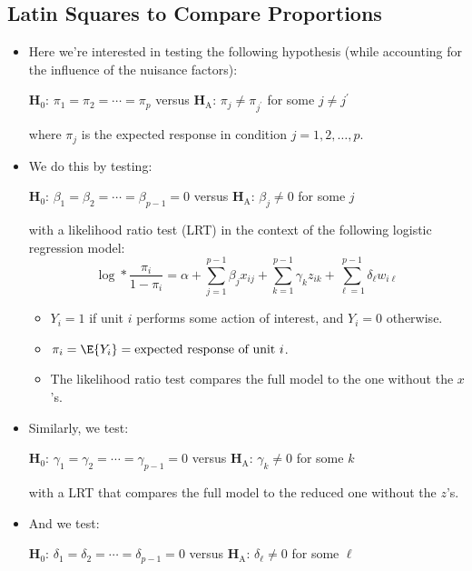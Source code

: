 \subsection{Latin Squares to Compare Proportions}
\begin{itemize}
    \item Here we're interested in testing the following hypothesis (while accounting for the influence of the
          nuisance factors):
          \begin{tightcenter}
              $ \mathbf{H}_0 $: $ \pi_1=\pi_2=\cdots=\pi_p $ versus $ \mathbf{H}_\text{A} $: $ \pi_j\ne \pi_{j^\prime }$ for some $ j\ne j^\prime $
          \end{tightcenter}
          where $ \pi_j $ is the expected response in condition $ j=1,2,\ldots,p $.
    \item We do this by testing:
          \begin{tightcenter}
              $ \mathbf{H}_0 $: $ \beta_1=\beta_2=\cdots=\beta_{p-1}=0 $ versus $ \mathbf{H}_\text{A} $: $ \beta_j\ne 0$ for some $ j $
          \end{tightcenter}
          with a likelihood ratio test (LRT) in the context of the following logistic regression model:
          \[ \log*{\frac{\pi_i}{1-\pi_i}}=\alpha+\sum_{j=1}^{p-1} \beta_j x_{ij}+\sum_{k=1}^{p-1} \gamma_k z_{ik}+\sum_{\ell=1}^{p-1} \delta_\ell w_{i\ell} \]
          \begin{itemize}
              \item $ Y_i=1 $ if unit $ i $ performs some action of interest, and $ Y_i=0 $ otherwise.
              \item $ \pi_i=\E{Y_i}=\text{expected response of unit $i$} $.
              \item The likelihood ratio test compares the full model to the one without the $ x $'s.
          \end{itemize}
    \item Similarly, we test:
          \begin{tightcenter}
              $ \mathbf{H}_0 $: $ \gamma_1=\gamma_2=\cdots=\gamma_{p-1}=0 $ versus $ \mathbf{H}_\text{A} $: $ \gamma_k\ne 0$ for some $ k $
          \end{tightcenter}
          with a LRT that compares the full model to the reduced one without the $ z $'s.
    \item And we test:
          \begin{tightcenter}
              $ \mathbf{H}_0 $: $ \delta_1=\delta_2=\cdots=\delta_{p-1}=0 $ versus $ \mathbf{H}_\text{A} $: $ \delta_\ell\ne 0$ for some $ \ell $

\end{tightcenter}
\end{itemize}
